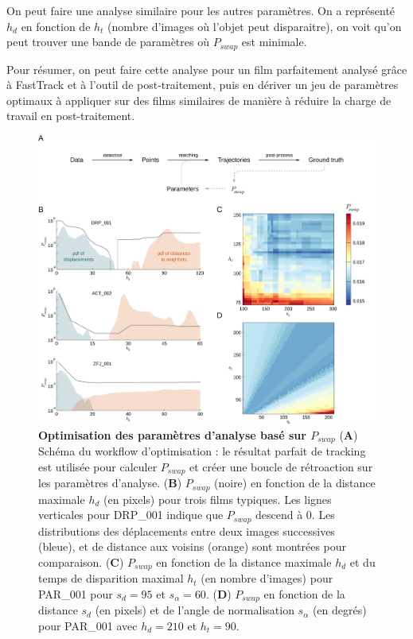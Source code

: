 	On peut faire une analyse similaire pour les autres paramètres. On a représenté $h_d$ en fonction de $h_t$ (nombre d'images où l'objet peut disparaitre), on voit qu'on peut trouver une bande de paramètres où $P_{swap}$ est minimale.
	
	Pour résumer, on peut faire cette analyse pour un film parfaitement analysé grâce à FastTrack et à l'outil de post-traitement, puis en dériver un jeu de paramètres optimaux à appliquer sur des films similaires de manière à réduire la charge de travail en post-traitement.
\medbreak
	
	\begin{figure}[h]
    \centering
    \includegraphics[width=1\textwidth]{part_1/assets/Figure_4.png}    
    \caption{\textbf{Optimisation des paramètres d'analyse basé sur $P_{swap}$} (\textbf{A}) Schéma du workflow d'optimisation : le résultat parfait de tracking est utilisée pour calculer $P_{swap}$ et créer une boucle de rétroaction sur les paramètres d'analyse. (\textbf{B}) $P_{swap}$ (noire) en fonction de la distance maximale $h_d$ (en pixels) pour trois films typiques. Les lignes verticales pour DRP\_001 indique que $P_{swap}$ descend à 0. Les distributions des déplacements entre deux images successives (bleue), et de distance aux voisins (orange) sont montrées pour comparaison. (\textbf{C}) $P_{swap}$ en fonction de la distance maximale $h_d$ et du temps de disparition maximal $h_t$ (en nombre d'images) pour PAR\_001 pour $s_d=95$ et $s_{\alpha}=60$. (\textbf{D}) $P_{swap}$ en fonction de la distance $s_d$ (en pixels) et de l'angle de normalisation $s_{\alpha}$ (en degrés) pour PAR\_001 avec $h_d=210$ et $h_t=90$. } 
    \label{part_1:fig_4}
    \end{figure}
	
